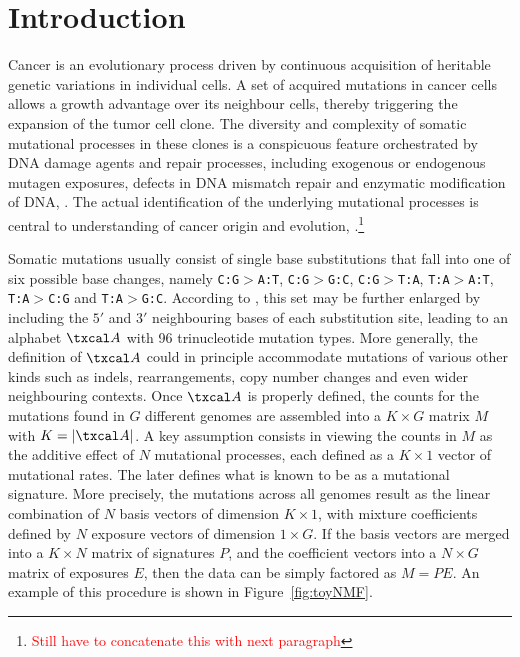 \documentclass{bioinfo}
\begin{document}
\section{Introduction}
Cancer is an evolutionary process driven by continuous acquisition of
heritable genetic variations in individual cells. A set of acquired
mutations in cancer cells allows a growth advantage over its neighbour
cells, thereby triggering the expansion of the tumor cell clone. The
diversity and complexity of somatic mutational processes in these
clones is a conspicuous feature orchestrated by DNA damage agents and
repair processes, including exogenous or endogenous mutagen exposures,
defects in DNA mismatch repair and enzymatic modification of DNA,
\cite{RG}. The actual identification of the underlying mutational
processes is central to understanding of cancer origin and evolution,
\citealp{RG, AS, HEN}.\footnote{\textcolor{red}{Still have to
    concatenate this with next paragraph}}


Somatic mutations usually consist of single base substitutions that
fall into one of six possible base changes, namely
\texttt{C:G}$>$\texttt{A:T}, \texttt{C:G}$>$\texttt{G:C},
\texttt{C:G}$>$\texttt{T:A}, \texttt{T:A}$>$\texttt{A:T},
\texttt{T:A}$>$\texttt{C:G} and \texttt{T:A}$>$\texttt{G:C}. According
to \cite{A}, this set may be further enlarged by including the $5'$
and $3'$ neighbouring bases of each substitution site, leading to an 
alphabet $\txcal A$ with 96 trinucleotide mutation types. More
generally, the definition of $\txcal A$ could in principle accommodate
mutations of various other kinds such as indels, rearrangements, copy
number changes and even wider neighbouring contexts. Once $\txcal A$
is properly defined, the counts for the mutations found in $G$
different genomes are assembled into a $K\times G$ matrix $M$ with $K
= |\txcal A|$. A key assumption consists in viewing the counts in $M$
as the additive effect of $N$ mutational processes, each defined as a
$K\times 1$ vector of mutational rates. The later defines what
is known to be as a mutational signature. More precisely, the
mutations across all genomes result as the linear combination of $N$
basis vectors of dimension $K\times 1$, with mixture coefficients
defined by $N$ exposure vectors of dimension $1 \times G$. If the
basis vectors are merged into a $K\times N$ matrix of signatures $P$,
and the coefficient vectors into a $N\times G$ matrix of exposures
$E$, then the data can be simply factored as $M=PE$. An example of
this procedure is shown in Figure~\ref{fig:toyNMF}.
\end{document}
